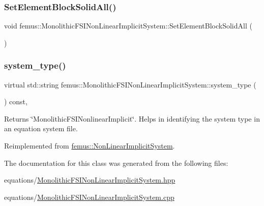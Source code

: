 \subsubsection{\texorpdfstring{Set\+Element\+Block\+Solid\+All()}{SetElementBlockSolidAll()}}
{\footnotesize\ttfamily void femus\+::\+Monolithic\+F\+S\+I\+Non\+Linear\+Implicit\+System\+::\+Set\+Element\+Block\+Solid\+All (\begin{DoxyParamCaption}{ }\end{DoxyParamCaption})}

\mbox{\label{classfemus_1_1_monolithic_f_s_i_non_linear_implicit_system_a29bb0bdaf1eec888af05e8e57469faf4}} 
\subsubsection{\texorpdfstring{system\+\_\+type()}{system\_type()}}
{\footnotesize\ttfamily virtual std\+::string femus\+::\+Monolithic\+F\+S\+I\+Non\+Linear\+Implicit\+System\+::system\+\_\+type (\begin{DoxyParamCaption}{ }\end{DoxyParamCaption}) const\hspace{0.3cm}{\ttfamily [inline]}, {\ttfamily [virtual]}}

\begin{DoxyReturn}{Returns}
{\ttfamily \char`\"{}\+Monolithic\+F\+S\+I\+Nonlinear\+Implicit\char`\"{}}. Helps in identifying the system type in an equation system file. 
\end{DoxyReturn}


Reimplemented from \mbox{\hyperlink{classfemus_1_1_non_linear_implicit_system_a8f4727b8b763bdac9f58b4c9dbb097be}{femus\+::\+Non\+Linear\+Implicit\+System}}.



The documentation for this class was generated from the following files\+:\begin{DoxyCompactItemize}
\item 
equations/\mbox{\hyperlink{_monolithic_f_s_i_non_linear_implicit_system_8hpp}{Monolithic\+F\+S\+I\+Non\+Linear\+Implicit\+System.\+hpp}}\item 
equations/\mbox{\hyperlink{_monolithic_f_s_i_non_linear_implicit_system_8cpp}{Monolithic\+F\+S\+I\+Non\+Linear\+Implicit\+System.\+cpp}}\end{DoxyCompactItemize}
